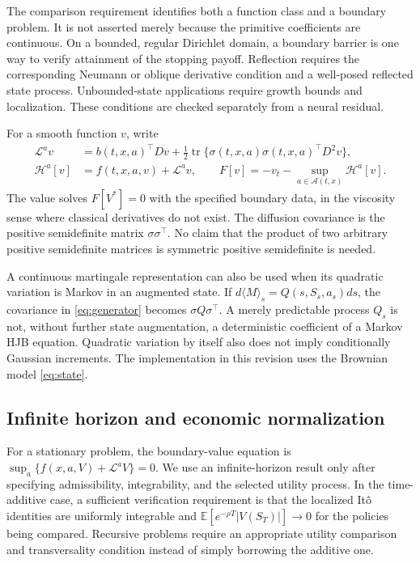 \documentclass[ecta,draft]{econsocart}
\theoremstyle{definition}
\theoremstyle{remark}
\newcommand{\E}{\mathbb E}
\newcommand{\HH}{\mathcal H}
\newcommand{\LL}{\mathcal L}
\newcommand{\Act}{\mathcal A}
\newcommand{\tr}{\operatorname{tr}}
\begin{document}
The comparison requirement identifies both a function class and a boundary problem. It is not asserted merely because the primitive coefficients are continuous. On a bounded, regular Dirichlet domain, a boundary barrier is one way to verify attainment of the stopping payoff. Reflection requires the corresponding Neumann or oblique derivative condition and a well-posed reflected state process. Unbounded-state applications require growth bounds and localization. These conditions are checked separately from a neural residual.

For a smooth function $v$, write
\begin{align}
 \LL^a v&=b(t,x,a)^\top Dv+\tfrac12\tr\{\sigma(t,x,a)\sigma(t,x,a)^\top D^2v\},\label{eq:generator}\\
 \HH^a[v]&=f(t,x,a,v)+\LL^a v,\qquad
 F[v]=-v_t-\sup_{a\in\Act(t,x)}\HH^a[v].\label{eq:hjb}
\end{align}
The value solves $F[V^*]=0$ with the specified boundary data, in the viscosity sense where classical derivatives do not exist. The diffusion covariance is the positive semidefinite matrix $\sigma\sigma^\top$. No claim that the product of two arbitrary positive semidefinite matrices is symmetric positive semidefinite is needed.

A continuous martingale representation can also be used when its quadratic variation is Markov in an augmented state. If $d\langle M\rangle_s=Q(s,S_s,a_s)ds$, the covariance in \eqref{eq:generator} becomes $\sigma Q\sigma^\top$. A merely predictable process $Q_s$ is not, without further state augmentation, a deterministic coefficient of a Markov HJB equation. Quadratic variation by itself also does not imply conditionally Gaussian increments. The implementation in this revision uses the Brownian model \eqref{eq:state}.

\subsection{Infinite horizon and economic normalization}
For a stationary problem, the boundary-value equation is $\sup_a\{f(x,a,V)+\LL^aV\}=0$. We use an infinite-horizon result only after specifying admissibility, integrability, and the selected utility process. In the time-additive case, a sufficient verification requirement is that the localized It\^o identities are uniformly integrable and $\E[e^{-\rho T}|V(S_T)|]\to0$ for the policies being compared. Recursive problems require an appropriate utility comparison and transversality condition instead of simply borrowing the additive one.
\end{document}
